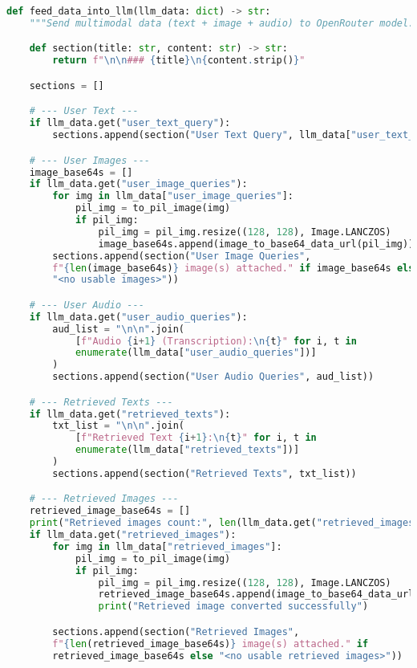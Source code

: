 \documentclass{article}
\begin{document}
\begin{latin}
\begin{lstlisting}[language=Python]
def feed_data_into_llm(llm_data: dict) -> str:
    """Send multimodal data (text + image + audio) to OpenRouter model."""

    def section(title: str, content: str) -> str:
        return f"\n\n### {title}\n{content.strip()}"

    sections = []

    # --- User Text ---
    if llm_data.get("user_text_query"):
        sections.append(section("User Text Query", llm_data["user_text_query"]))

    # --- User Images ---
    image_base64s = []
    if llm_data.get("user_image_queries"):
        for img in llm_data["user_image_queries"]:
            pil_img = to_pil_image(img)
            if pil_img:
                pil_img = pil_img.resize((128, 128), Image.LANCZOS)
                image_base64s.append(image_to_base64_data_url(pil_img))
        sections.append(section("User Image Queries",
        f"{len(image_base64s)} image(s) attached." if image_base64s else
        "<no usable images>"))

    # --- User Audio ---
    if llm_data.get("user_audio_queries"):
        aud_list = "\n\n".join(
            [f"Audio {i+1} (Transcription):\n{t}" for i, t in
            enumerate(llm_data["user_audio_queries"])]
        )
        sections.append(section("User Audio Queries", aud_list))

    # --- Retrieved Texts ---
    if llm_data.get("retrieved_texts"):
        txt_list = "\n\n".join(
            [f"Retrieved Text {i+1}:\n{t}" for i, t in
            enumerate(llm_data["retrieved_texts"])]
        )
        sections.append(section("Retrieved Texts", txt_list))

    # --- Retrieved Images ---
    retrieved_image_base64s = []
    print("Retrieved images count:", len(llm_data.get("retrieved_images", [])))
    if llm_data.get("retrieved_images"):
        for img in llm_data["retrieved_images"]:
            pil_img = to_pil_image(img)
            if pil_img:
                pil_img = pil_img.resize((128, 128), Image.LANCZOS)
                retrieved_image_base64s.append(image_to_base64_data_url(pil_img))
                print("Retrieved image converted successfully")

        sections.append(section("Retrieved Images",
        f"{len(retrieved_image_base64s)} image(s) attached." if
        retrieved_image_base64s else "<no usable retrieved images>"))


\end{lstlisting}
\end{latin}
\end{document}
